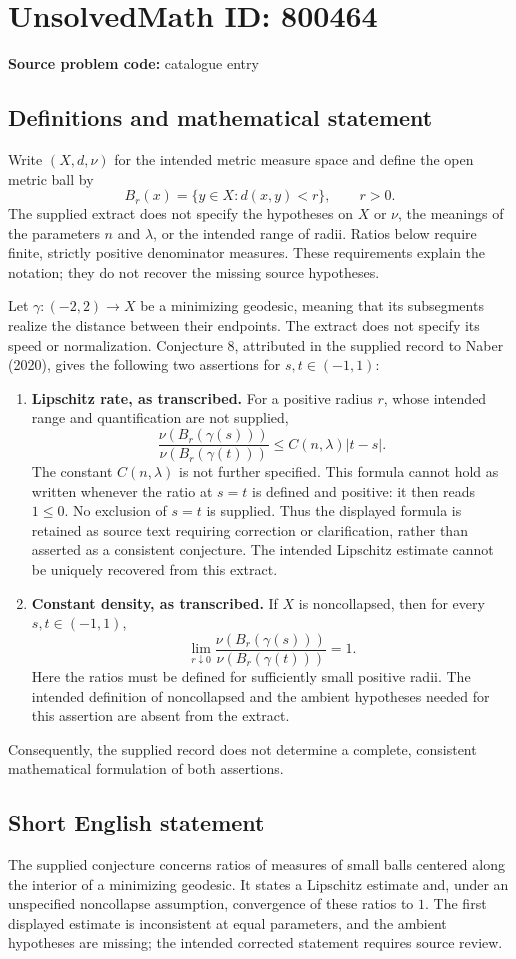 \documentclass[11pt]{article}
\begin{document}
\section*{UnsolvedMath ID: 800464}
\textbf{Source problem code:} catalogue entry
\subsection{Definitions and mathematical statement}
Write \((X,d,\nu)\) for the intended metric measure space and define the open metric ball by
\[
B_r(x)=\{y\in X:d(x,y)<r\},\qquad r>0.
\]
The supplied extract does not specify the hypotheses on \(X\) or \(\nu\), the meanings of the parameters \(n\) and \(\lambda\), or the intended range of radii. Ratios below require finite, strictly positive denominator measures. These requirements explain the notation; they do not recover the missing source hypotheses.

Let \(\gamma:(-2,2)\to X\) be a minimizing geodesic, meaning that its subsegments realize the distance between their endpoints. The extract does not specify its speed or normalization. Conjecture 8, attributed in the supplied record to Naber (2020), gives the following two assertions for \(s,t\in(-1,1)\):
\begin{enumerate}
\item \textbf{Lipschitz rate, as transcribed.} For a positive radius \(r\), whose intended range and quantification are not supplied,
\[
\frac{\nu(B_r(\gamma(s)))}{\nu(B_r(\gamma(t)))}
\leq C(n,\lambda)|t-s|.
\]
The constant \(C(n,\lambda)\) is not further specified. This formula cannot hold as written whenever the ratio at \(s=t\) is defined and positive: it then reads \(1\leq0\). No exclusion of \(s=t\) is supplied. Thus the displayed formula is retained as source text requiring correction or clarification, rather than asserted as a consistent conjecture. The intended Lipschitz estimate cannot be uniquely recovered from this extract.
\item \textbf{Constant density, as transcribed.} If \(X\) is noncollapsed, then for every \(s,t\in(-1,1)\),
\[
\lim_{r\downarrow0}
\frac{\nu(B_r(\gamma(s)))}{\nu(B_r(\gamma(t)))}=1.
\]
Here the ratios must be defined for sufficiently small positive radii. The intended definition of noncollapsed and the ambient hypotheses needed for this assertion are absent from the extract.
\end{enumerate}
Consequently, the supplied record does not determine a complete, consistent mathematical formulation of both assertions.
\subsection{Short English statement}
The supplied conjecture concerns ratios of measures of small balls centered along the interior of a minimizing geodesic. It states a Lipschitz estimate and, under an unspecified noncollapse assumption, convergence of these ratios to \(1\). The first displayed estimate is inconsistent at equal parameters, and the ambient hypotheses are missing; the intended corrected statement requires source review.
\end{document}
